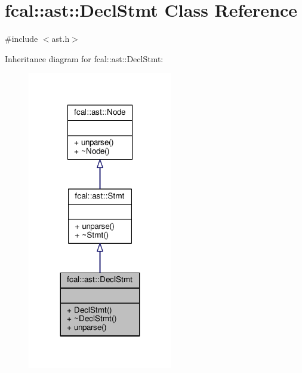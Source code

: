 \hypertarget{classfcal_1_1ast_1_1DeclStmt}{}\section{fcal\+:\+:ast\+:\+:Decl\+Stmt Class Reference}
\label{classfcal_1_1ast_1_1DeclStmt}


{\ttfamily \#include $<$ast.\+h$>$}



Inheritance diagram for fcal\+:\+:ast\+:\+:Decl\+Stmt\+:
\nopagebreak
\begin{figure}[H]
\begin{center}
\leavevmode
\includegraphics[width=179pt]{classfcal_1_1ast_1_1DeclStmt__inherit__graph}
\end{center}
\end{figure}


